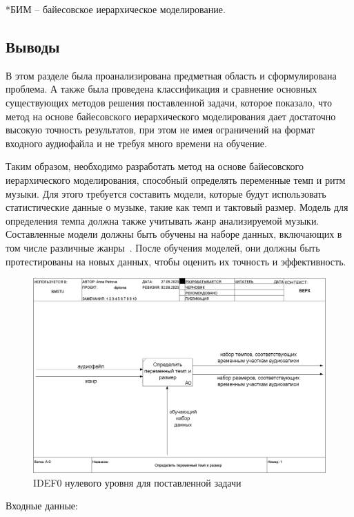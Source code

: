 \newpage

*БИМ -- байесовское иерархическое моделирование.

\subsection*{Выводы}

В этом разделе была проанализирована предметная область и сформулирована проблема. А также была проведена классификация и сравнение основных существующих методов решения поставленной задачи, которое показало, что метод на основе байесовского иерархического моделирования дает достаточно высокую точность результатов, при этом не имея ограничений на формат входного аудиофайла и не требуя много времени на обучение.

Таким образом, необходимо разработать метод на основе байесовского иерархического моделирования, способный определять переменные темп и ритм музыки. Для этого требуется составить модели, которые будут использовать статистические данные о музыке, такие как темп и тактовый размер. Модель для определения темпа должна также учитывать жанр анализируемой музыки. Составленные модели должны быть обучены на наборе данных, включающих в том числе различные жанры~\cite{dataset}. После обучения моделей, они должны быть протестированы на новых данных, чтобы оценить их точность и эффективность.

\begin{figure}[h]
	\centering
	\includegraphics[scale=0.3]{inc/img/idef_analit.png}
	\caption{IDEF0 нулевого уровня для поставленной задачи}
	\label{img:idef_0}
\end{figure}

Входные данные:

